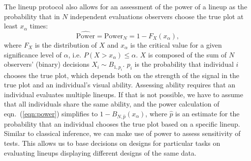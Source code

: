 \documentclass{article} %
\newcommand{\hh}[1]{{\color{orange} #1}}
\begin{document}
The lineup protocol also allows for an assessment of the power of a lineup \citep{mahbub:2013} as the probability that in $N$ independent evaluations observers choose the true plot at least $x_\alpha$ times:
\begin{equation}\label{eqn:power}
\widehat{\text{Power}} = \text{Power}_{N} = 1 - F_{X} (x_{\alpha}),
\end{equation}
where $F_X$ is the distribution of $X$ and $x_\alpha$ is the critical value for a given significance level of $\alpha$, i.e. $P(X >  x_{\alpha}) \le \alpha$. $X$ is composed of the sum of $N$ observers' (binary) decisions $X_i \sim B_{1, p_i}$.  $p_i$ is the probability that individual $i$ chooses the true plot, which  depends both on the strength of the signal in the true plot and an individual's visual ability.
Assessing ability requires that an individual evaluates multiple lineups. If that is not possible, we have to assume that all individuals share the same ability, and the power calculation of eqn.~(\ref{eqn:power}) simplifies to $1 - B_{N, \hat{p}}(x_\alpha)$, where $\widehat{p}$ is an estimate for the probability that an individual chooses the true plot based on a specific lineup. \hh{Similar to classical inference, we can make use of power to assess sensitivity of tests. This allows us to base decisions on designs for particular tasks on evaluating lineups displaying different designs of the same data. }
\end{document}
